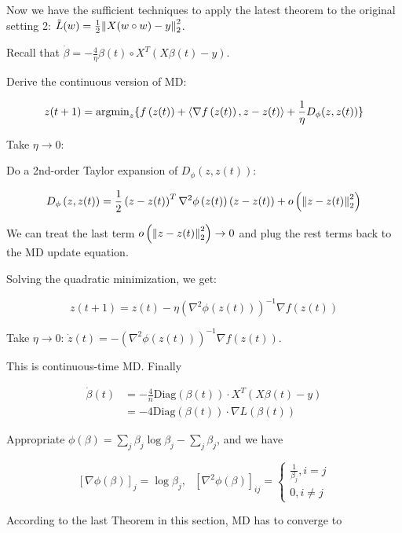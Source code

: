 Now we have the sufficient techniques to apply the latest theorem to the original setting 2: 
\(\tilde{L}(w) = \frac{1}{2} \norm{X(w \circ w)-y}_2^2\). 

Recall that \(\dot{\beta} = - \frac{4}{\eta} \beta(t) \circ X^T \left(X\beta(t)-y\right)\). 

Derive the continuous version of MD: 

\[
    z(t + 1) = \text{argmin}_z \{  f\left(z(t)\right) + \langle \nabla f\left(z(t)\right), z - z(t) \rangle
    + \frac{1}{\eta} D_\phi (z, z(t)) \}
\] 

Take \(\eta \to 0\): 

Do a 2nd-order Taylor expansion of \(D_\phi (z, z(t))\): 

\[
    D_\phi \left( z, z(t)\right) = \frac{1}{2} \left(z - z(t)\right)^T \nabla^2 \phi \left(z(t)\right)
    \left(z - z(t)\right) + o\left(\norm{z - z(t)}_2^2\right)
\]

We can treat the last term \(o\left(\norm{z - z(t)}_2^2\right) \to 0\) and plug the rest terms back to the MD 
update equation. 

Solving the quadratic minimization, we get: 

\[
    z(t+1) = z(t) - \eta \left(\nabla^2 \phi \left(z(t)\right)\right)^{-1} \nabla f \left(z(t)\right)
\]

Take \(\eta \to 0\): \(\dot{z} (t) = - \left( \nabla^2 \phi \left(z(t)\right)    \right)^{-1} \nabla f\left( z(t) \right)\). 

This is continuous-time MD. Finally 

\begin{align*}
    \dot{\beta}(t) &= - \frac{4}{n} \text{Diag} \left(\beta(t)\right) \cdot X^T \left(X \beta(t) - y\right) \\ 
                   &= - 4 \text{Diag} \left(\beta(t)\right) \cdot \nabla L \left(\beta(t)\right)
\end{align*}


Appropriate \(\phi (\beta) = \sum_j \beta_j \log \beta_j - \sum_j \beta_j\), and we have 

\[
    [\nabla \phi (\beta)]_j = \log \beta_j, \ \ \ [\nabla^2 \phi(\beta)]_{ij} = \begin{cases}
        \frac{1}{\beta_j}, i = j \\ 
        0, i \neq j 
    \end{cases}
\]

According to the last Theorem in this section, MD has to converge to 

